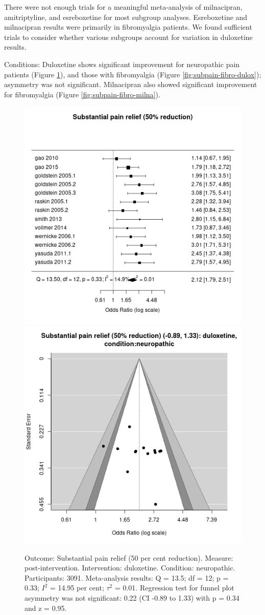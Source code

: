\documentclass{report}\usepackage[]{graphicx}\usepackage[]{color}
\newenvironment{knitrout}{}{} %
\begin{document}
There were not enough trials for a meaningful meta-analysis of milnacipran, amitriptyline, and esreboxetine for most subgroup analyses. Esreboxetine and milnacipran results were primarily in fibromyalgia patients. We found sufficient trials to consider whether various subgroups account for variation in duloxetine results.

Conditions: Duloxetine shows significant improvement for neuropathic pain patients (Figure \ref{fig:subpain-neuro-dulox}), and those with fibromyalgia (Figure \ref{fig:subpain-fibro-dulox}); asymmetry was not significant. Milnacipran also showed significant improvement for fibromyalgia (Figure \ref{fig:subpain-fibro-milna}).

\begin{figure}

\begin{knitrout}
\color{fgcolor}
\includegraphics[width=0.5\linewidth,height=0.35\textheight]{img/pain_sub-duloxetine-condition-neuropathic-forest} 
\includegraphics[width=0.5\linewidth,height=0.35\textheight]{img/pain_sub-duloxetine-condition-neuropathic-funnel} 
\end{knitrout}

\caption[Substantial pain: duloxetine, neuropathic]{Outcome: Substantial pain relief  (50 per cent reduction). Measure: post-intervention. Intervention: duloxetine. Condition: neuropathic. Participants: 3091. Meta-analysis results: Q = 13.5; df = 12; p = 0.33; $I^2$ = 14.95 per cent; $\tau^2$ = 0.01. Regression test for funnel plot asymmetry was not significant: 0.22 (CI -0.89 to 1.33) with p = 0.34 and z = 0.95.}
\label{fig:subpain-neuro-dulox}
\end{figure}
\end{document}
